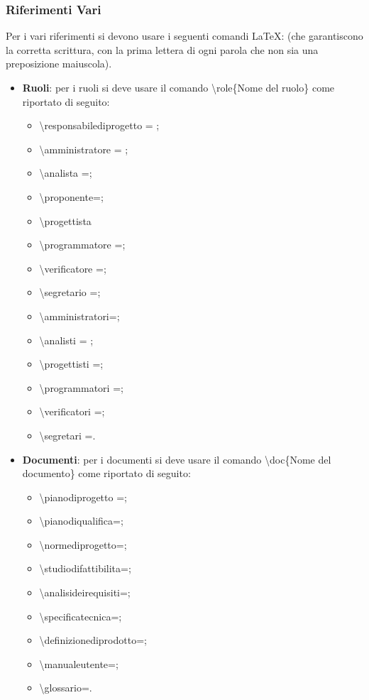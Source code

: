 \documentclass[../NormeDiProgetto.tex]{subfiles}
\begin{document}
			\subsubsection{Riferimenti Vari} Per i vari riferimenti si devono usare i seguenti comandi \LaTeX: (che garantiscono la corretta scrittura, con la prima lettera di ogni parola che non sia una preposizione maiuscola).
			\begin{itemize}
				\item \textbf{Ruoli}: per i ruoli si deve usare il comando \textbackslash role\{Nome del ruolo\} come riportato di seguito:
					\begin{itemize}
					 	\item \textbackslash responsabilediprogetto = \responsabilediprogetto ; 
					 	\item \textbackslash amministratore = \amministratore ;
					 	\item \textbackslash analista =\analista ;
					 	\item \textbackslash proponente=\analista ;
					 	\item \textbackslash progettista
					 	\item \textbackslash programmatore =\programmatore ;
					 	\item \textbackslash verificatore =\verificatore ;
					 	\item \textbackslash segretario =\segretario ;
					 	\item \textbackslash amministratori=\amministratori ;
					 	\item \textbackslash analisti = \analisti ;
					 	\item \textbackslash progettisti =\progettisti ;
					 	\item \textbackslash programmatori =\programmatori ;
					 	\item \textbackslash verificatori =\verificatori ;
					 	\item \textbackslash segretari =\segretari .
					\end{itemize}	
				\item \textbf{Documenti}: per i documenti si deve usare il comando \textbackslash doc\{Nome del documento\} come riportato di seguito:
					\begin{itemize}
						\item \textbackslash pianodiprogetto =\pianodiprogetto ;
						\item \textbackslash pianodiqualifica=\pianodiqualifica ;
						\item \textbackslash normediprogetto=\normediprogetto ;
						\item \textbackslash studiodifattibilita=\studiodifattibilita ;
						\item \textbackslash analisideirequisiti=\analisideirequisiti ;
						\item \textbackslash specificatecnica=\specificatecnica ;
						\item \textbackslash definizionediprodotto= ;
						\item \textbackslash manualeutente=\manualeutente ;
						\item \textbackslash glossario=\glossario .
								

\end{itemize}
\end{itemize}
\end{document}

